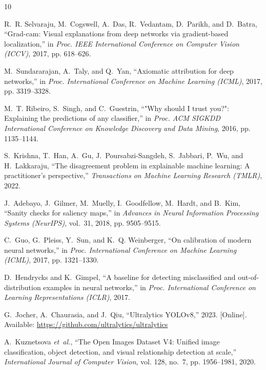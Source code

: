 \documentclass[journal,10pt,twocolumn]{IEEEtran}
\begin{document}
\begin{thebibliography}{10}

R.~R. Selvaraju, M.~Cogswell, A.~Das, R.~Vedantam, D.~Parikh, and D.~Batra,
  ``Grad-cam: Visual explanations from deep networks via gradient-based
  localization,'' in \emph{Proc. IEEE International Conference on Computer Vision (ICCV)}, 2017, pp. 618--626.

M.~Sundararajan, A.~Taly, and Q.~Yan, ``Axiomatic attribution for deep
  networks,'' in \emph{Proc. International Conference on Machine Learning (ICML)}, 2017, pp. 3319--3328.

M.~T. Ribeiro, S.~Singh, and C.~Guestrin, ``"Why should I trust you?":
  Explaining the predictions of any classifier,'' in \emph{Proc. ACM SIGKDD International Conference on Knowledge Discovery and Data Mining}, 2016, pp. 1135--1144.

S.~Krishna, T.~Han, A.~Gu, J.~Poursabzi-Sangdeh, S.~Jabbari, P.~Wu, and H.~Lakkaraju,
  ``The disagreement problem in explainable machine learning: A practitioner's perspective,''
  \emph{Transactions on Machine Learning Research (TMLR)}, 2022.

J.~Adebayo, J.~Gilmer, M.~Muelly, I.~Goodfellow, M.~Hardt, and B.~Kim, ``Sanity
  checks for saliency maps,'' in \emph{Advances in Neural Information Processing Systems (NeurIPS)}, vol.~31, 2018, pp. 9505--9515.

C.~Guo, G.~Pleiss, Y.~Sun, and K.~Q. Weinberger, ``On calibration of modern
  neural networks,'' in \emph{Proc. International Conference on Machine Learning (ICML)}, 2017, pp. 1321--1330.

D.~Hendrycks and K.~Gimpel, ``A baseline for detecting misclassified and
  out-of-distribution examples in neural networks,'' in \emph{Proc. International Conference on Learning Representations (ICLR)}, 2017.

G.~Jocher, A.~Chaurasia, and J.~Qiu, ``Ultralytics YOLOv8,'' 2023. [Online]. Available: \url{https://github.com/ultralytics/ultralytics}

A.~Kuznetsova \emph{et~al.},
  ``The Open Images Dataset V4: Unified image classification, object detection, and visual relationship detection at scale,''
  \emph{International Journal of Computer Vision}, vol. 128, no.~7, pp. 1956--1981, 2020.


\end{thebibliography}
\end{document}
